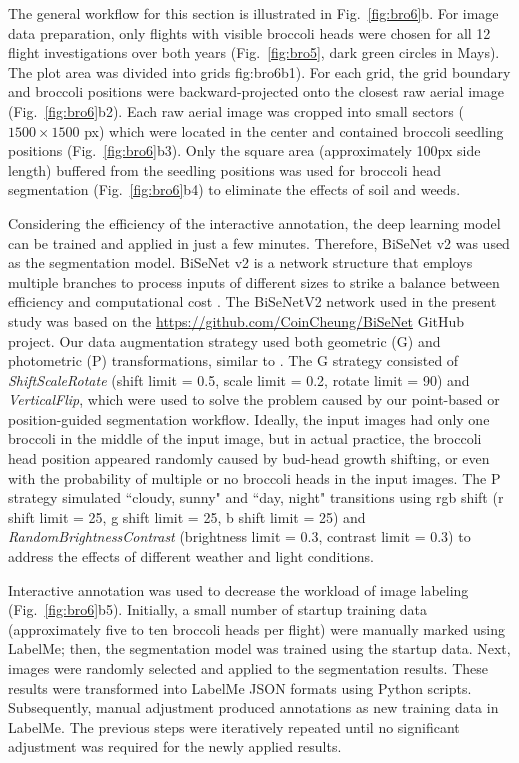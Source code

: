 The general workflow for this section is illustrated in Fig.~\ref{fig:bro6}b. For image data preparation, only flights with visible broccoli heads were chosen for all 12 flight investigations over both years (Fig.~\ref{fig:bro5}, dark green circles in Mays). The plot area was divided into grids {fig:bro6}b1). For each grid, the grid boundary and broccoli positions were backward-projected onto the closest raw aerial image (Fig.~\ref{fig:bro6}b2). Each raw aerial image was cropped into small sectors ($1500 \times 1500$ px) which were located in the center and contained broccoli seedling positions (Fig.~\ref{fig:bro6}b3). Only the square area (approximately 100px side length) buffered from the seedling positions was used for broccoli head segmentation (Fig.~\ref{fig:bro6}b4) to eliminate the effects of soil and weeds.

Considering the efficiency of the interactive annotation, the deep learning model can be trained and applied in just a few minutes. Therefore, BiSeNet v2 \citep{yu_bisenet_2020} was used as the segmentation model. BiSeNet v2 is a network structure that employs multiple branches to process inputs of different sizes to strike a balance between efficiency and computational cost \citep[Fig.~1]{yu_bisenet_2020}. The BiSeNetV2 network used in the present study was based on the \url{https://github.com/CoinCheung/BiSeNet} GitHub project. Our data augmentation strategy used both geometric (G) and photometric (P) transformations, similar to \citet{blok_effect_2021}. The G strategy consisted of \textit{ShiftScaleRotate} (shift limit = 0.5, scale limit = 0.2, rotate limit = 90) and \textit{VerticalFlip}, which were used to solve the problem caused by our point-based or position-guided segmentation workflow. Ideally, the input images had only one broccoli in the middle of the input image, but in actual practice, the broccoli head position appeared randomly caused by bud-head growth shifting, or even with the probability of multiple or no broccoli heads in the input images. The P strategy simulated ``cloudy, sunny" and ``day, night" transitions using \gls{rgb} shift (r shift limit = 25, g shift limit = 25, b shift limit = 25) and \textit{RandomBrightnessContrast} (brightness limit = 0.3, contrast limit = 0.3) to address the effects of different weather and light conditions.

Interactive annotation was used to decrease the workload of image labeling \linebreak (Fig.~\ref{fig:bro6}b5). Initially, a small number of startup training data (approximately five to ten broccoli heads per flight) were manually marked using LabelMe; then, the segmentation model was trained using the startup data. Next, images were randomly selected and applied to the segmentation results. These results were transformed into LabelMe JSON formats using Python scripts. Subsequently, manual adjustment produced annotations as new training data in LabelMe. The previous steps were iteratively repeated until no significant adjustment was required for the newly applied results.

